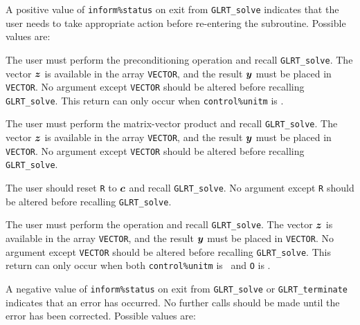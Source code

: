 \documentclass{galahad}
\newcommand{\packagename}{GL\-RT}
\begin{document}

\galreverse
A positive value of {\tt inform\%status} on exit from
{\tt \packagename\_solve} indicates that the user needs to take appropriate
action before re-entering the subroutine. Possible values are:

\begin{description}

 The user must perform the preconditioning operation
and recall {\tt \packagename\_solve}.
The vector ${\bm{z}}$ is available in the array {\tt VECTOR}, and the result
${\bm{y}}$ must be placed in {\tt VECTOR}.
No argument except {\tt VECTOR} should be altered before recalling
{\tt \packagename\_solve}. This return can only occur when
{\tt control\%unitm} is \false.

 The user must perform the matrix-vector product
\disp{\bmy := \bmH \bmz}
and recall {\tt \packagename\_solve}.
The vector ${\bm{z}}$ is available in the array {\tt VECTOR}, and the result
${\bm{y}}$ must be placed in {\tt VECTOR}.
No argument except {\tt VECTOR} should be altered before recalling
{\tt \packagename\_solve}.

  The user should reset {\tt R} to ${\bm{c}}$ and recall
{\tt \packagename\_solve}.
No argument except {\tt R} should be altered before recalling
{\tt \packagename\_solve}.

 The user must perform the operation
\disp{\bmy := \bmM \bmz,}
and recall {\tt \packagename\_solve}.
The vector ${\bm{z}}$ is available in the array {\tt VECTOR}, and the result
${\bm{y}}$ must be placed in {\tt VECTOR}.
No argument except {\tt VECTOR} should be altered before recalling
{\tt \packagename\_solve}. This return can only occur when
both {\tt control\%unitm} is \false\ and {\tt O} is \present.
\end{description}


\galerrors
A negative value of  {\tt inform\%status} on exit from
{\tt \packagename\_solve}
or
{\tt \packagename\_terminate}
indicates that an error has occurred. No further calls should be made
until the error has been corrected. Possible values are:
\end{document}

